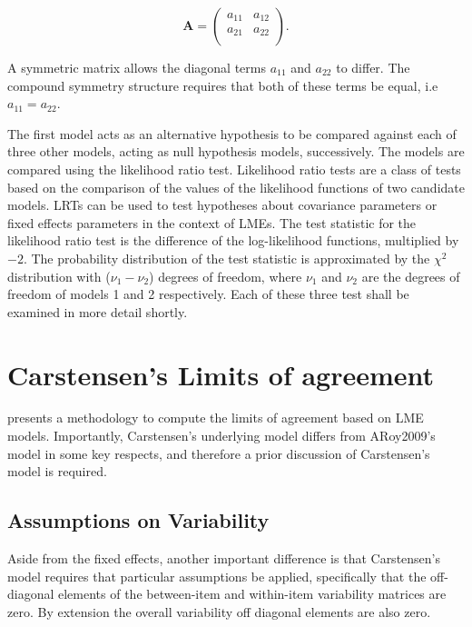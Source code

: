 \documentclass[12pt, a4paper]{report}
\theoremstyle{plain}
\theoremstyle{definition}
\theoremstyle{remark}
\begin{document}
	\[
	\boldsymbol{A} = \left( \begin{array}{cc}
	a_{11} & a_{12}  \\
	a_{21} & a_{22}  \\
	\end{array}\right).
	\]
	
	A symmetric matrix allows the diagonal terms $a_{11}$ and $a_{22}$ to differ. The compound symmetry structure requires that both of these terms be equal, i.e $a_{11} = a_{22}$.
	
	The first model acts as an alternative hypothesis to be compared against each of three other models, acting as null hypothesis models, successively. The models are compared using the likelihood ratio test. Likelihood ratio tests are a class of tests based on the comparison of the values of the likelihood functions of two candidate models. LRTs can be used to test hypotheses about covariance parameters or fixed effects parameters in the context of LMEs. The test statistic for the likelihood ratio test is the difference of the log-likelihood functions, multiplied by $-2$.
	The probability distribution of the test statistic is approximated by the $\chi^2$ distribution with ($\nu_{1} - \nu_{2}$) degrees of freedom, where $\nu_{1}$ and $\nu_{2}$ are the degrees of freedom of models 1 and 2 respectively. Each of these three test shall be examined in more detail shortly.
	\section{Carstensen's Limits of agreement}
	\citet{BXC2008} presents a methodology to compute the limits of
	agreement based on LME models. Importantly, Carstensen's underlying model differs from ARoy2009's model in some key respects, and therefore a prior discussion of Carstensen's model is required.
	
	
	
	\subsection{Assumptions on Variability}
	
	Aside from the fixed effects, another important difference is that Carstensen's model requires that particular assumptions be applied, specifically that the off-diagonal elements of the between-item
	and within-item variability matrices are zero. By extension the
	overall variability off diagonal elements are also zero.
	
\end{document}
